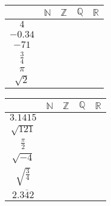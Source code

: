 \begin{questions}
	\question

	
	\begin{minipage}{\linewidth}
	\begin{multicols}{2}
		\begin{tabular}{|c|c|c|c|c|}
			\hline
			                & $ \mathbb{N}$ & $ \mathbb{Z}  $ & $ \mathbb{Q}$ & $ \mathbb{R} $ \\
			\hline
			     $ 4 $      &      \solonly{\checkmark }         &  \solonly{\checkmark }                &    \solonly{\checkmark }            &    \solonly{\checkmark }             \\
			\hline
			   $ -0.34 $    &               &                 &    \solonly{\checkmark }            &      \solonly{\checkmark }           \\
			\hline
			    $ -71 $     &               &      \solonly{\checkmark }            &    \solonly{\checkmark }            &   \solonly{\checkmark }              \\
			\hline
			$ \frac{3}{4} $ &               &                 &     \solonly{\checkmark }           &        \solonly{\checkmark }         \\
			\hline
			    $ \pi $     &               &                 &               &    \solonly{\checkmark }             \\
			\hline
			 $ \sqrt{2} $   &               &                 &               &    \solonly{\checkmark }             \\
			\hline
		\end{tabular}
		
		\begin{tabular}{|c|c|c|c|c|}
			\hline
			                       & $ \mathbb{N}$ & $ \mathbb{Z}  $ & $ \mathbb{Q}$ & $ \mathbb{R} $ \\
			\hline
			      $ 3.1415 $       &               &                 &    \solonly{\checkmark }            &      \solonly{\checkmark }           \\
			\hline
			    $ \sqrt{121} $     &  \solonly{\checkmark }              &    \solonly{\checkmark }              &   \solonly{\checkmark }             &   \solonly{\checkmark }              \\
			\hline
			  $ \frac{\pi}{2} $    &               &                 &               &   \solonly{\checkmark }              \\
			\hline
			    $ \sqrt{-4} $      &               &                 &               &                \\
			\hline
			$ \sqrt{\frac{3}{4}} $ &               &                 &               &    \solonly{\checkmark }             \\
			\hline
			 $ 2.\overline{342} $  &               &                 &    \solonly{\checkmark }            &    \solonly{\checkmark }             \\
			\hline
		\end{tabular}
		

\end{multicols}
\end{minipage}
\end{questions}

